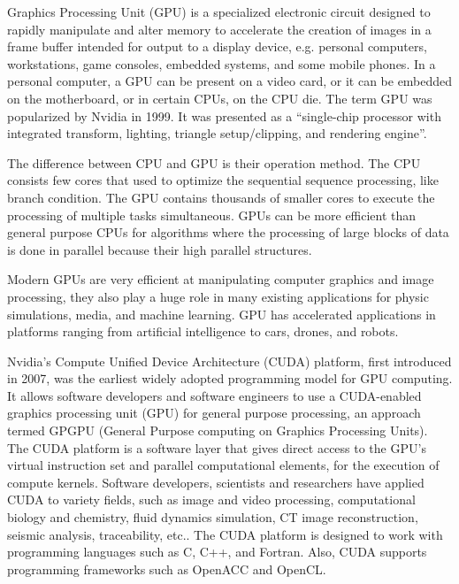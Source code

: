 Graphics Processing Unit (GPU) is a specialized electronic circuit designed to rapidly manipulate and alter memory to accelerate the creation of images in a frame buffer intended for output to a display device, e.g. personal computers, workstations, game consoles, embedded systems, and some mobile phones. In a personal computer, a GPU can be present on a video card, or it can be embedded on the motherboard, or in certain CPUs, on the CPU die. The term GPU was popularized by Nvidia in 1999. It was presented as a ``single-chip processor with integrated transform, lighting, triangle setup/clipping, and rendering engine''.

The difference between CPU and GPU is their operation method. The CPU consists few cores that used to optimize the sequential sequence processing, like branch condition. The GPU contains thousands of smaller cores to execute the processing of multiple tasks simultaneous. GPUs can be more efficient than general purpose CPUs for algorithms where the processing of large blocks of data is done in parallel because their high parallel structures.

Modern GPUs are very efficient at manipulating computer graphics and image processing, they also play a huge role in many existing applications for physic simulations, media, and machine learning. GPU has accelerated applications in platforms ranging from artificial intelligence to cars, drones, and robots.

Nvidia's Compute Unified Device Architecture (CUDA) platform, first introduced in 2007, was the earliest widely adopted programming model for GPU computing. It allows software developers and software engineers to use a CUDA-enabled graphics processing unit (GPU) for general purpose processing, an approach termed GPGPU (General Purpose computing on Graphics Processing Units). The CUDA platform is a software layer that gives direct access to the GPU's virtual instruction set and parallel computational elements, for the execution of compute kernels. Software developers, scientists and researchers have applied CUDA to variety fields, such as image and video processing, computational biology and chemistry, fluid dynamics simulation, CT image reconstruction, seismic analysis, traceability, etc.. The CUDA platform is designed to work with programming languages such as C, C++, and Fortran. Also, CUDA supports programming frameworks such as OpenACC and OpenCL.

